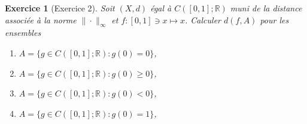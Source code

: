 \documentclass{article}
\newtheorem{exercise}{Exercice} %
\begin{document}
\begin{exercise}[Exercice 2]
Soit $(X, d)$ égal à $C([0, 1]; \mathbb{R})$ muni de la distance associée à la norme $\| \cdot \|_\infty$ et $f: [0, 1] \ni x \mapsto x$. Calculer $d(f, A)$ pour les ensembles
\begin{enumerate}
    \item $A = \{ g \in C([0, 1]; \mathbb{R}) : g(0) = 0 \}$,
    \item $A = \{ g \in C([0, 1]; \mathbb{R}) : g(0) \geq 0 \}$,
    \item $A = \{ g \in C([0, 1]; \mathbb{R}) : g(0) < 0 \}$,
    \item $A = \{ g \in C([0, 1]; \mathbb{R}) : g(0) = 1 \}$,
\end{enumerate}
\end{exercise}
\end{document}

